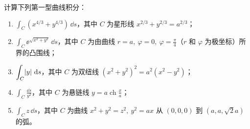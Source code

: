 \begin{xexercise}[1]
计算下列第一型曲线积分：
\begin{enumerate}[label=(\arabic*)]
  \item $\displaystyle\int_C(x^{4/3}+y^{4/3})\,\dd s$，其中 $C$ 为星形线 $x^{2/3}+y^{2/3}=a^{2/3}$；
  \item $\displaystyle\int_C \ee^{\sqrt{x^2+y^2}}\,\dd s$，其中 $C$ 为由曲线 $r=a,\ \varphi=0,\ \varphi=\frac\pi4$（$r$ 和 $\varphi$ 为极坐标）所界的凸围线；
  \item $\displaystyle\int_C\lvert y\rvert\,\mathop{}\!\mathrm{d} s$，其中 $C$ 为双纽线 $(x^2+y^2)^2=a^2(x^2-y^2)$；
  \item $\displaystyle\int_C\frac{\dd s}{y^2}$，其中 $C$ 为悬链线 $y=a\operatorname{ch}\frac xa$；
  \item $\displaystyle\int_C z\,\dd s$，其中 $C$ 为曲线 $x^2+y^2=z^2,\ y^2=ax$ 从 $(0,0,0)$ 到 $(a,a,\sqrt2a)$ 的弧。
\end{enumerate}
\end{xexercise}
